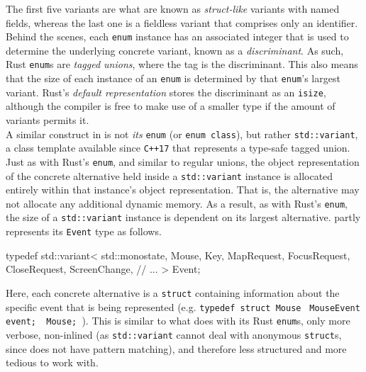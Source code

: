 The   first  five   variants  are   what  are   known  as   \textit{struct-like}
variants   with  named   fields,   whereas   the  last   one   is  a   fieldless
variant  that   comprises  only  an   identifier\cite{therustreference}.  Behind
the   scenes,   each   \texttt{enum}  instance   has   an   associated
integer   that  is   used  to   determine  the   underlying  concrete   variant,
known   as  a   \textit{discriminant}\cite{therustreference}.   As  such,   Rust
\texttt{enum}s  are  \textit{tagged  unions},  where the  tag  is  the
discriminant.  This   also  means  that  the   size  of  each  instance   of  an
\texttt{enum} is determined  by that \texttt{enum}'s largest
variant. Rust's  \textit{default representation}  stores the discriminant  as an
\texttt{isize}, although the compiler is free to make use of a smaller
type if the amount of variants permits it\cite{therustreference}.\\


A  similar construct  in  \cpp is  not  \textit{its} \texttt{enum}  (or
\texttt{enum  class}),  but  rather  \texttt{std::variant},  a
class template available since \texttt{C++17} that represents a type-safe tagged
union\cite{cppstd}. Just as with  Rust's \texttt{enum}, and similar to
regular  unions, the  object  representation of  the  concrete alternative  held
inside a  \texttt{std::variant} instance  is allocated  entirely within
that instance's object representation\cite{cppstd}. That is, the alternative may
not allocate  any additional dynamic  memory\cite{cppstd}. As a result,  as with
Rust's  \texttt{enum}, the  size  of a  \texttt{std::variant}
instance  is dependent  on its  largest alternative\cite{cppstd}.  \wmcpp partly
represents its \texttt{Event} type as follows.

\begin{cppblock}
  typedef std::variant<
    std::monostate,
    Mouse,
    Key,
    MapRequest,
    FocusRequest,
    CloseRequest,
    ScreenChange,
    // ...
  > Event;
\end{cppblock}

Here,   each   concrete   alternative   is   a   \cpp   \texttt{struct}
containing   information    about   the    specific   event   that    is   being
represented  (e.g.  \texttt{typedef  struct  Mouse}  \texttt{{
MouseEvent   event;   }   Mouse;   }).   This   is   similar   to   what   \wmrs
does   with    its   Rust    \texttt{enum}s,   only    more   verbose,
non-inlined  (as  \texttt{std::variant}   cannot  deal  with  anonymous
\texttt{struct}s,  since  \cpp does  not  have  pattern matching),  and
therefore less structured and more tedious to work with.\\

